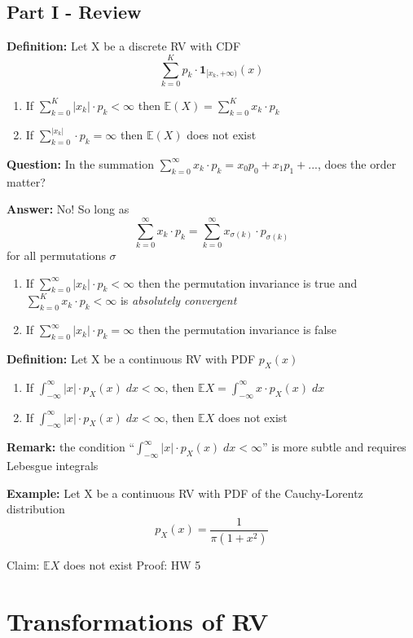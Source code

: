\documentclass[12pt]{article}
\begin{document}
\subsection*{Part I - Review}
\textbf{Definition:} Let X be a discrete RV with CDF 
\[\sum_{k=0}^K p_k \cdot \mathbf{1}_{[x_k, +\infty)}(x)\]
\begin{enumerate}
    \item If $\sum_{k=0}^K |x_k| \cdot p_k < \infty$ then $\mathbb{E}(X) = \sum_{k=0}^K x_k \cdot p_k$
    \item If $\sum_{k=0}^ |x_k| \cdot p_k = \infty$ then $\mathbb{E}(X)$ does not exist
\end{enumerate}

\textbf{Question:} In the summation $\sum_{k=0}^\infty x_k \cdot p_k = x_0 p_0 + x_1 p_1 +...$, does the order matter?

\textbf{Answer:} No! So long as 
\[\sum_{k=0}^\infty x_k \cdot p_k = \sum_{k=0}^\infty x_{\sigma(k)} \cdot p_{\sigma(k)} \]
for all permutations $\sigma$

\begin{enumerate}
    \item If $\sum_{k=0}^\infty |x_k| \cdot p_k < \infty$ then the permutation invariance is true and  $\sum_{k=0}^K x_k \cdot p_k < \infty$ is \emph{absolutely convergent}
    \item If $\sum_{k=0}^\infty |x_k| \cdot p_k = \infty$ then the permutation invariance is false
\end{enumerate}

\textbf{Definition:} Let X be a continuous RV with PDF $p_X(x)$
\begin{enumerate}
    \item If $\int_{-\infty}^{\infty} |x| \cdot p_X(x)\; dx < \infty$, then $\mathbb{E}X = \int_{-\infty}^{\infty} x \cdot p_X(x)\; dx$
    \item If $\int_{-\infty}^{\infty} |x| \cdot p_X(x)\; dx < \infty$, then $\mathbb{E}X$ does not exist 
\end{enumerate}

\textbf{Remark:} the condition ``$\int_{-\infty}^{\infty} |x| \cdot p_X(x)\; dx < \infty$'' is more subtle and requires Lebesgue integrals 

\textbf{Example:} Let X be a continuous RV with PDF of the Cauchy-Lorentz distribution
\[p_X(x) = \frac{1}{\pi(1 + x^2)}\]

Claim: $\mathbb{E}X$ does not exist 
Proof: HW 5

\section*{Transformations of RV}
\end{document}
